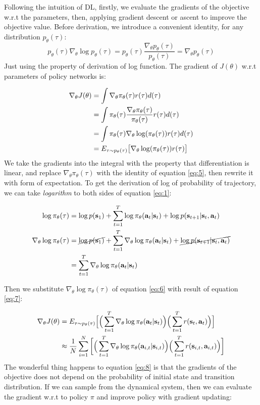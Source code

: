 \documentclass{tufte-handout}
\newcommand{\s}{\mathbf{s}}
\newcommand{\act}{\mathbf{a}}
\begin{document}
Following the intuition of DL, firstly, we evaluate the gradients of the objective w.r.t the parameters, then, applying gradient descent or ascent to
improve the objective value. Before derivation, we introduce a convenient identity, for any distribution $p_\theta (\tau)$:
\begin{equation}
\label{eq:5}
p_\theta(\tau) \nabla_\theta \log p_\theta(\tau) = p_\theta(\tau) \frac{\nabla _ \theta p_\theta (\tau)}{p_\theta (\tau)}
= \nabla _ \theta p_\theta (\tau)
\end{equation}
Just using the property of derivation of log function.
The gradient of $J(\theta)$ w.r.t parameters of policy networks is:

\begin{align}
\label{eq:6}
\nabla _\theta J(\theta) &= \int \nabla _\theta \pi_\theta (\tau) r(\tau) d(\tau) \notag \\
&= \int \pi_\theta (\tau) \frac{\nabla _ \theta \pi_\theta (\tau)}{\pi_\theta (\tau)} r(\tau) d(\tau)\notag \\
& = \int \pi_\theta (\tau)\nabla _ \theta \log(\pi_\theta (\tau)) r(\tau) d(\tau)\notag \\
& = E_{\tau \sim p_\theta(\tau) } \big[\nabla _ \theta \log(\pi_\theta (\tau)) r(\tau)\big  ]
\end{align}
We take the gradients into the integral with the property that differentiation is linear, and replace $\nabla _\theta \pi_\theta (\tau)$
 with the identity of equation \ref{eq:5}, then rewrite it with form of expectation. To get the derivation of log of probability of trajectory,
 we can take \emph{logarithm} to both sides of equation \ref{eq:1}:

\begin{align}
\label{eq:7}
\log \pi_\theta(\tau) &= \log p(\s_1) + \sum_{t=1}^T \log \pi_\theta(\act_t| \s_t) + \log p(\s_{t+1} | \s_t, \act_t) \notag \\
\nabla_\theta \log \pi_\theta(\tau) &= \cancel{\log p(\s_1)} + \sum_{t=1}^T \nabla_\theta \log \pi_\theta(\act_t| \s_t) +
\cancel{\log p(\s_{t+1} | \s_t, \act_t)} \notag \\
 & = \sum_{t=1}^T \nabla_\theta \log \pi_\theta(\act_t| \s_t)
\end{align}

Then we substitute $\nabla_\theta \log \pi_\theta(\tau)$ of equation \ref{eq:6} with result of equation \ref{eq:7}:

\begin{align}
\label{eq:8}
\nabla _\theta J(\theta) & = E_{\tau \sim p_\theta(\tau) } \Big[ \Big(\sum_{t=1}^T \nabla_\theta \log \pi_\theta(\act_t| \s_t) \Big)
  \Big( \sum_{t=1}^T r(\s_t, \act_t) \Big)\Big] \notag \\
  & \approx \frac{1}{N} \sum_{i=1} ^ {N} \bigg[\Big(\sum_{t=1}^T \nabla_\theta \log \pi_\theta(\act_{i,t} | \s_{i,t}) \Big)
  \Big( \sum_{t=1}^T r(\s_{i,t}, \act_{i,t}) \Big) \bigg]
\end{align}
The wonderful thing happens to equation \ref{eq:8} is that the gradients of the objective does not depend on the probability of initial state and
 transition distribution. If we can sample from the dynamical system, then we can evaluate the gradient w.r.t to policy $\pi$ and improve policy with
 gradient updating:
\end{document}
